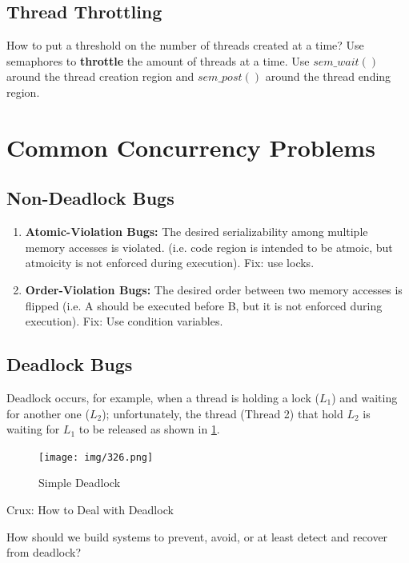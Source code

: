 \subsection{Thread Throttling}

How to put a threshold on the number of threads created at a time? Use semaphores
to \textbf{throttle} the amount of threads at a time. Use $sem\_wait()$ around 
the thread creation region and $sem\_post()$ around the thread ending region.

\section{Common Concurrency Problems}

\subsection{Non-Deadlock Bugs}

\begin{enumerate}
    \item \textbf{Atomic-Violation Bugs:} The desired serializability among
        multiple memory accesses is violated. (i.e. code region is intended
        to be atmoic, but atmoicity is not enforced during execution). Fix:
        use locks.

    \item \textbf{Order-Violation Bugs:} The desired order between two memory
        accesses is flipped (i.e. A should be executed before B, but it is not
        enforced during execution). Fix: Use condition variables.
\end{enumerate}

\subsection{Deadlock Bugs}

Deadlock occurs, for example, when a thread is holding a lock ($L_1$) and 
waiting for another one ($L_2$); unfortunately, the thread (Thread 2) that
hold $L_2$ is waiting for $L_1$ to be released as shown in \ref{326}.

\begin{figure}[h!]
    \label{326}
    \begin{center}
        \texttt{[image: img/326.png]}
        \caption{Simple Deadlock}
    \end{center}
\end{figure}

\begin{tcolorbox}
    \begin{center}
        Crux: How to Deal with Deadlock
    \end{center}

    How should we build systems to prevent, avoid, or at least detect and
    recover from deadlock?
\end{tcolorbox}

